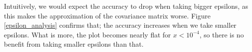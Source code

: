 \documentclass[12pt]{article}
\begin{document}
Intuitively, we would expect the accuracy to drop when taking bigger epsilons, as this makes the approximation of the covariance matrix worse. Figure \ref{epsilon_analysis} confirms that; the accuracy increases when we take smaller epsilons. What is more, the plot becomes nearly flat for $x<10^{-4}$, so there is no benefit from taking smaller epsilons than that.
\end{document}
